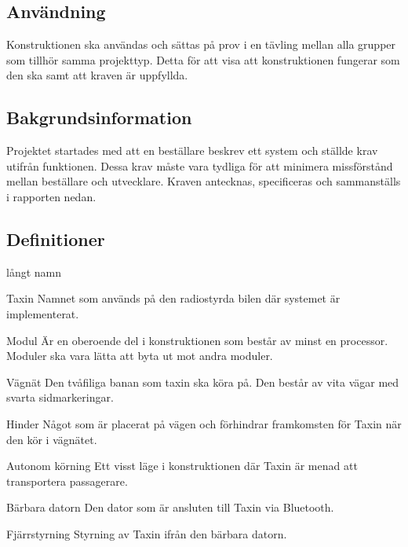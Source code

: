 \documentclass[kravspec/krav.tex]{subfiles}
\begin{document}
\subsection{Användning}
Konstruktionen ska användas och sättas på prov i en tävling mellan alla grupper
som tillhör samma projekttyp. Detta för att visa att konstruktionen fungerar
som den ska samt att kraven är uppfyllda.

\subsection{Bakgrundsinformation}
Projektet startades med att en beställare beskrev ett system och ställde krav
utifrån funktionen. Dessa krav måste vara tydliga för att minimera missförstånd
mellan beställare och utvecklare. Kraven antecknas, specificeras och
sammanställs i rapporten nedan.

\subsection{Definitioner}
\begin{labeling}{långt namn}
    \item[Taxin] Namnet som används på den radiostyrda bilen där systemet är
    implementerat.
    \item[Modul] Är en oberoende del i konstruktionen som består av minst en
    processor. Moduler ska vara lätta att byta ut mot andra moduler.
    \item[Vägnät] Den tvåfiliga banan som taxin ska köra på. Den består av vita
    vägar med svarta sidmarkeringar.
    \item[Hinder] Något som är placerat på vägen och förhindrar framkomsten för
    Taxin när den kör i vägnätet.
    \item[Autonom körning] Ett visst läge i konstruktionen där Taxin är menad
    att transportera passagerare.
    \item[Bärbara datorn] Den dator som är ansluten till Taxin via Bluetooth.
    \item[Fjärrstyrning] Styrning av Taxin ifrån den bärbara datorn. 
\end{labeling}
\end{document}

